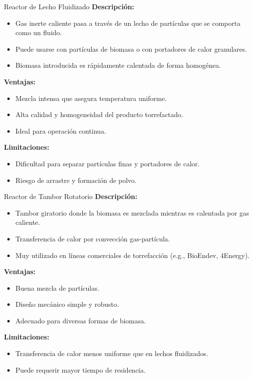 \documentclass[main.tex]{subfiles}
\begin{document}
\begin{frame}{Reactor de Lecho Fluidizado}
\footnotesize
\textbf{Descripción:}
\begin{itemize}
  \item Gas inerte caliente pasa a través de un lecho de partículas que se comporta como un fluido.
  \item Puede usarse con partículas de biomasa o con portadores de calor granulares.
  \item Biomasa introducida es rápidamente calentada de forma homogénea.
\end{itemize}

\textbf{Ventajas:}
\begin{itemize}
  \item Mezcla intensa que asegura temperatura uniforme.
  \item Alta calidad y homogeneidad del producto torrefactado.
  \item Ideal para operación continua.
\end{itemize}

\textbf{Limitaciones:}
\begin{itemize}
  \item Dificultad para separar partículas finas y portadores de calor.
  \item Riesgo de arrastre y formación de polvo.
\end{itemize}
\end{frame}


\begin{frame}{Reactor de Tambor Rotatorio}
\footnotesize
\textbf{Descripción:}
\begin{itemize}
  \item Tambor giratorio donde la biomasa es mezclada mientras es calentada por gas caliente.
  \item Transferencia de calor por convección gas-partícula.
  \item Muy utilizado en líneas comerciales de torrefacción (e.g., BioEndev, 4Energy).
\end{itemize}

\textbf{Ventajas:}
\begin{itemize}
  \item Buena mezcla de partículas.
  \item Diseño mecánico simple y robusto.
  \item Adecuado para diversas formas de biomasa.
\end{itemize}

\textbf{Limitaciones:}
\begin{itemize}
  \item Transferencia de calor menos uniforme que en lechos fluidizados.
  \item Puede requerir mayor tiempo de residencia.
\end{itemize}
\end{frame}
\end{document}
